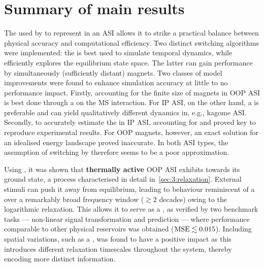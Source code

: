 \section{Summary of main results}
The  used by \textbf{\hotspice} to represent  in an ASI allows it to strike a practical balance between physical accuracy and computational efficiency.
Two distinct switching algorithms were implemented: the  is best used to simulate temporal dynamics, while  efficiently explores the equilibrium state space.
The latter can gain performance by simultaneously  (sufficiently distant) magnets.
Two classes of model improvements were found to enhance simulation accuracy at little to no performance impact.
Firstly, accounting for the finite size of magnets in OOP ASI is best done through a  on the MS interaction.
For IP ASI, on the other hand, a  is preferable and can yield qualitatively different dynamics in, e.g., kagome ASI.
Secondly, to accurately estimate the  in IP ASI, accounting for  and  proved key to reproduce experimental results.
For OOP magnets, however, an exact solution for an idealised energy landscape proved inaccurate.
In both ASI types, the assumption of switching by  therefore seems to be a poor approximation. \par
Using \hotspice, it was shown that \textbf{thermally active} OOP ASI exhibits  towards its ground state, a process characterised in detail in~\cref{sec:3:relaxation}.
External stimuli can push it away from equilibrium, leading to behaviour reminiscent of a  over a remarkably broad frequency window ($\gtrsim 2$ decades) owing to the logarithmic relaxation.
This allows it to serve as a  , as verified by two benchmark tasks --- non-linear signal transformation and  prediction --- where performance comparable to other physical reservoirs was obtained ($\mathrm{MSE} \lesssim 0.015$).
Including spatial variations, such as a , was found to have a positive impact as this introduces different relaxation timescales throughout the system, thereby encoding more distinct information. \par
